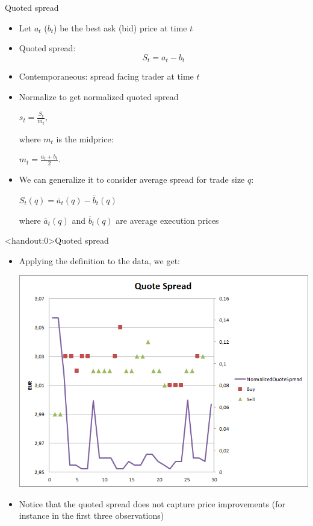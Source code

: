 \documentclass[english,10pt
,aspectratio=169
]{beamer}
\begin{document}
\begin{frame}{Quoted spread}
	\begin{itemize}
		\item Let $a_t$ ($b_t$) be the best ask (bid) price at time $t$
		\item \alert{Quoted spread}:
		\begin{equation*}
			S_t = a_t -b_t
		\end{equation*}
		\item Contemporaneous: spread facing trader at time $t$
		\item \pause Normalize to get \alert{normalized quoted spread}
		\begin{center}
			$
			s_t = \frac{S_t}{m_t},
			$
		\end{center}
		where $m_t$ is the midprice:
		\begin{center}
			$
			m_t = \frac{a_t+b_t}{2}.
			$
		\end{center}
		\pause
		\item We can generalize it to consider average spread for trade size $q$: 
		\begin{center}$S_t(q)=\overline{a}_t(q)-\overline{b}_t(q)$\end{center}
		where $\overline{a}_t(q)$ and $\overline{b}_t(q)$ are average execution prices
	\end{itemize}
\end{frame}


\begin{frame}<handout:0>{Quoted spread}
	\begin{itemize}
		\item Applying the definition to the data, we get:
		\begin{center}	
			\includegraphics[scale=0.35]{pics/L2_quotespread}
		\end{center}
		\item Notice that the quoted spread does not capture price improvements (for instance in the first three observations)
	\end{itemize}
\end{frame}
\end{document}
